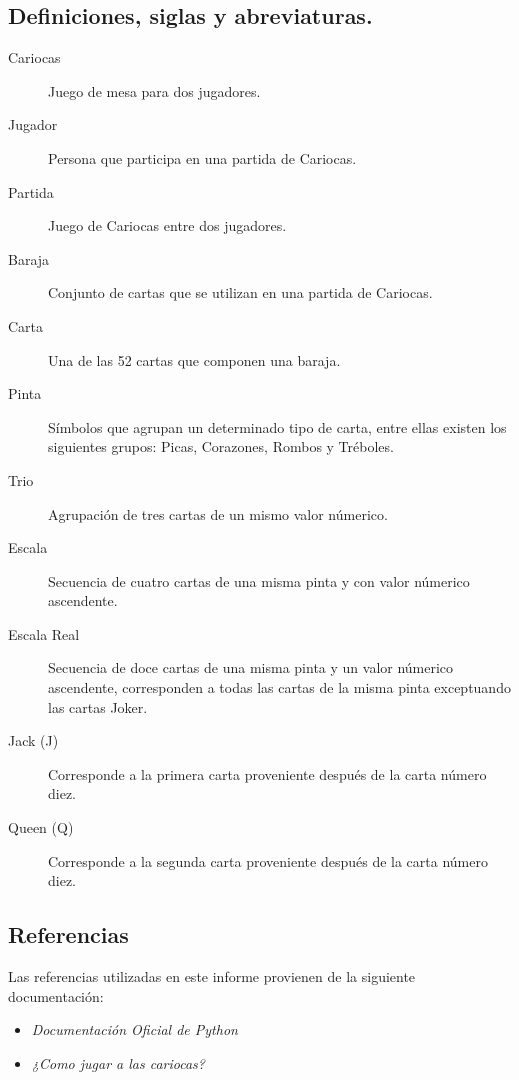 \subsection{Definiciones, siglas y abreviaturas.}\label{cap:definiciones}
\begin{description}
    \item[Cariocas] Juego de mesa para dos jugadores.
    \item[Jugador] Persona que participa en una partida de Cariocas.
    \item[Partida] Juego de Cariocas entre dos jugadores.
    \item[Baraja] Conjunto de cartas que se utilizan en una partida de Cariocas.
    \item[Carta] Una de las 52 cartas que componen una baraja.
    \item[Pinta] Símbolos que agrupan un determinado tipo de carta, entre ellas existen los siguientes grupos: Picas, Corazones, Rombos y Tréboles.
    \item[Trio] Agrupación de tres cartas de un mismo valor númerico.
    \item[Escala] Secuencia de cuatro cartas de una misma pinta y con valor númerico ascendente.
    \item[Escala Real] Secuencia de doce cartas de una misma pinta y un valor númerico ascendente, corresponden a todas las cartas de la misma pinta exceptuando las cartas Joker.
    \item[Jack (J)] Corresponde a la primera carta proveniente después de la carta número diez.
    \item[Queen (Q)] Corresponde a la segunda carta proveniente después de la carta número diez.
\end{description}

\subsection{Referencias}
Las referencias utilizadas en este informe provienen de la siguiente documentación:
\begin{itemize}
    \item \textit{Documentación Oficial de Python} \cite{python}
    \item \textit{¿Como jugar a las cariocas?} \cite{cariocas}
\end{itemize}